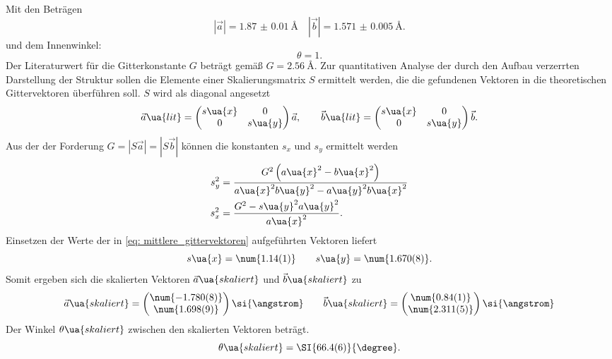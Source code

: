 Mit den Beträgen
\begin{equation}
  \left|\vec{a}\right| = \SI{1.87(1)}{\angstrom} \quad \left|\vec{b}\right| = \SI{1.571(5)}{\angstrom}.
  \label{eq: mittlere_gittervektoren}
\end{equation}
und dem Innenwinkel:
\begin{equation}
  \theta = 1.
\end{equation}
Der Literaturwert für die Gitterkonstante $G$ beträgt gemäß \cite{} $G = \SI{2.56}{\angstrom}$. Zur quantitativen Analyse
der durch den Aufbau verzerrten Darstellung der Struktur sollen die Elemente einer Skalierungsmatrix $S$ ermittelt werden, die
die gefundenen Vektoren in die theoretischen Gittervektoren überführen soll. $S$ wird als diagonal angesetzt
\begin{equation}
  \vec{a}\ua{lit} = \begin{pmatrix} s\ua{x} & 0 \\  0  &   s\ua{y} \end{pmatrix} \vec{a},
  \qquad \vec{b}\ua{lit} = \begin{pmatrix} s\ua{x} & 0 \\  0  &   s\ua{y} \end{pmatrix} \vec{b}.
\end{equation}
Aus der der Forderung $G = \left|S \vec{a}\right| = \left|S \vec{b}\right|$ können die konstanten $s_x$ und $s_y$ ermittelt werden
\begin{align}
  s_y^2 &= \frac{G^2\left( a\ua{x}^2 - b\ua{x}^2\right)}{a\ua{x}^2 b\ua{y}^2 - a\ua{y}^2 b\ua{x}^2} \\
  s_x^2 &= \frac{G^2 - s\ua{y}^2 a\ua{y}^2}{a\ua{x}^2}.
\end{align}
Einsetzen der Werte der in \eqref{eq: mittlere_gittervektoren} aufgeführten Vektoren liefert
\begin{equation}
  s\ua{x} = \num{1.14(1)}  \qquad s\ua{y} = \num{1.670(8)}.
\end{equation}
Somit ergeben sich die skalierten Vektoren $\vec{a}\ua{skaliert}$ und $\vec{b}\ua{skaliert}$ zu
\begin{equation}
  \vec{a}\ua{skaliert} = \begin{pmatrix} \num{-1.780(8)} \\  \num{1.698(9)} \end{pmatrix}\si{\angstrom} \qquad
  \vec{b}\ua{skaliert} = \begin{pmatrix} \num{0.84(1)} \\  \num{2.311(5)} \end{pmatrix}\si{\angstrom}
\end{equation}
Der Winkel $\theta\ua{skaliert}$ zwischen den skalierten Vektoren beträgt.
\begin{equation}
  \theta\ua{skaliert} = \SI{66.4(6)}{\degree}.
\end{equation}


